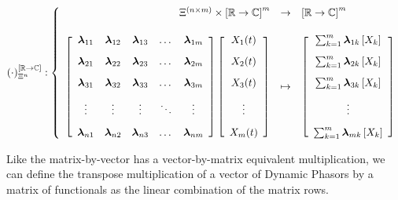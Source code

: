\begin{equation} %
\left(\cdot\right)_{\Xi^n}^{\left[\mathbb{R}\to\mathbb{C}\right]}:
%
\left\{\begin{array}{rcl}
	\Xi^{\left(n\times m\right)} \times \left[\mathbb{R}\to\mathbb{C}\right]^m &\to& \left[\mathbb{R}\to\mathbb{C}\right]^m \\[5mm]
\left[\begin{array}{ccccc} 
	\dpL_{11} & \dpL_{12} & \dpL_{13} & \dots  & \dpL_{1m} \\[3mm]
	\dpL_{21} & \dpL_{22} & \dpL_{23} & \dots  & \dpL_{2m} \\[3mm]
	\dpL_{31} & \dpL_{32} & \dpL_{33} & \dots  & \dpL_{3m} \\[3mm]
	\vdots    & \vdots    & \vdots    & \ddots & \vdots    \\[3mm]
	\dpL_{n1} & \dpL_{n2} & \dpL_{n3} & \dots  & \dpL_{nm}
\end{array}\right]
%
\left[\begin{array}{c} X_1(t) \\[3mm] X_2(t) \\[3mm] X_3(t) \\[3mm] \vdots \\[3mm] X_m(t) \end{array}\right] & \mapsto &
%
\left[\begin{array}{c}
\sum_{k=1}^m \dpL_{1k}\left[X_k\right] \\[3mm]
\sum_{k=1}^m \dpL_{2k}\left[X_k\right] \\[3mm]
\sum_{k=1}^m \dpL_{3k}\left[X_k\right] \\[3mm]
\vdots                                 \\[3mm]
\sum_{k=1}^m \dpL_{mk}\left[X_k\right]
\end{array}\right]
\end{array}\right. \label{eq:matrix_by_dpvec_def}
\end{equation} %

	Like the matrix-by-vector has a vector-by-matrix equivalent multiplication, we can define the transpose multiplication of a vector of Dynamic Phasors by a matrix of functionals as the linear combination of the matrix rows.

